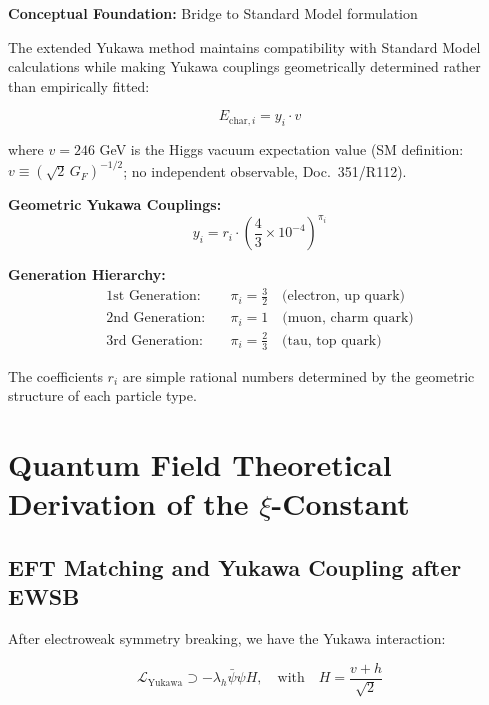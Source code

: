 	\textbf{Conceptual Foundation:} Bridge to Standard Model formulation
	
	The extended Yukawa method maintains compatibility with Standard Model calculations while making Yukawa couplings geometrically determined rather than empirically fitted:
	
	\begin{equation}
		E_{\text{char},i} = y_i \cdot v
		\label{eq:yukawa_mass_formula}
	\end{equation}
	
	where $v = 246$ GeV is the Higgs vacuum expectation value (SM definition: $v\equiv(\sqrt{2}\,G_F)^{-1/2}$; no independent observable, Doc.~351/R112).
	
	\textbf{Geometric Yukawa Couplings:}
	\begin{equation}
		\boxed{y_i = r_i \cdot \left(\frac{4}{3} \times 10^{-4}\right)^{\pi_i}}
		\label{eq:geometric_yukawa}
	\end{equation}
	
	\textbf{Generation Hierarchy:}
	\begin{align}
		\text{1st Generation:} \quad &\pi_i = \frac{3}{2} \quad \text{(electron, up quark)} \\
		\text{2nd Generation:} \quad &\pi_i = 1 \quad \text{(muon, charm quark)} \\
		\text{3rd Generation:} \quad &\pi_i = \frac{2}{3} \quad \text{(tau, top quark)}
	\end{align}
	
	The coefficients $r_i$ are simple rational numbers determined by the geometric structure of each particle type.
	
	\section{Quantum Field Theoretical Derivation of the $\xi$-Constant}
	\label{sec:qft_derivation}
	
	\subsection{EFT Matching and Yukawa Coupling after EWSB}
	\label{subsec:eft_matching}
	
	After electroweak symmetry breaking, we have the Yukawa interaction:
	
	\begin{equation}
		\mathcal{L}_{\text{Yukawa}} \supset -\lambda_h \bar{\psi}\psi H, \quad \text{with} \quad H = \frac{v + h}{\sqrt{2}}
	\end{equation}
	
